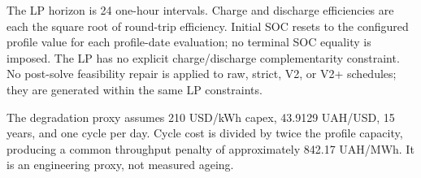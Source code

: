 \begin{table}[t]
\centering
\caption{Configured BESS profiles used in every paired comparison.}
\label{tab:04:data:protocol:1}
\small
{}
\end{table}

The LP horizon is 24 one-hour intervals. Charge and discharge efficiencies are each the square root of round-trip efficiency. Initial SOC resets to the configured profile value for each profile-date evaluation; no terminal SOC equality is imposed. The LP has no explicit charge/discharge complementarity constraint. No post-solve feasibility repair is applied to raw, strict, V2, or V2+ schedules; they are generated within the same LP constraints.

The degradation proxy assumes 210 USD/kWh capex, 43.9129 UAH/USD, 15 years, and one cycle per day. Cycle cost is divided by twice the profile capacity, producing a common throughput penalty of approximately 842.17 UAH/MWh. It is an engineering proxy, not measured ageing.

